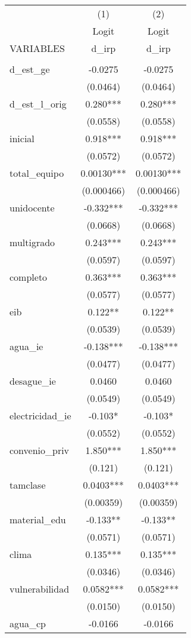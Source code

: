 \documentclass[]{article}
\begin{document}
\begin{tabular}{lcc} \hline
 & (1) & (2) \\
 & Logit & Logit \\
VARIABLES & d\_irp & d\_irp \\ \hline
 &  &  \\
d\_est\_ge & -0.0275 & -0.0275 \\
 & (0.0464) & (0.0464) \\
d\_est\_l\_orig & 0.280*** & 0.280*** \\
 & (0.0558) & (0.0558) \\
inicial & 0.918*** & 0.918*** \\
 & (0.0572) & (0.0572) \\
total\_equipo & 0.00130*** & 0.00130*** \\
 & (0.000466) & (0.000466) \\
unidocente & -0.332*** & -0.332*** \\
 & (0.0668) & (0.0668) \\
multigrado & 0.243*** & 0.243*** \\
 & (0.0597) & (0.0597) \\
completo & 0.363*** & 0.363*** \\
 & (0.0577) & (0.0577) \\
eib & 0.122** & 0.122** \\
 & (0.0539) & (0.0539) \\
agua\_ie & -0.138*** & -0.138*** \\
 & (0.0477) & (0.0477) \\
desague\_ie & 0.0460 & 0.0460 \\
 & (0.0549) & (0.0549) \\
electricidad\_ie & -0.103* & -0.103* \\
 & (0.0552) & (0.0552) \\
convenio\_priv & 1.850*** & 1.850*** \\
 & (0.121) & (0.121) \\
tamclase & 0.0403*** & 0.0403*** \\
 & (0.00359) & (0.00359) \\
material\_edu & -0.133** & -0.133** \\
 & (0.0571) & (0.0571) \\
clima & 0.135*** & 0.135*** \\
 & (0.0346) & (0.0346) \\
vulnerabilidad & 0.0582*** & 0.0582*** \\
 & (0.0150) & (0.0150) \\
agua\_cp & -0.0166 & -0.0166 \\

\end{tabular}
\end{document}
